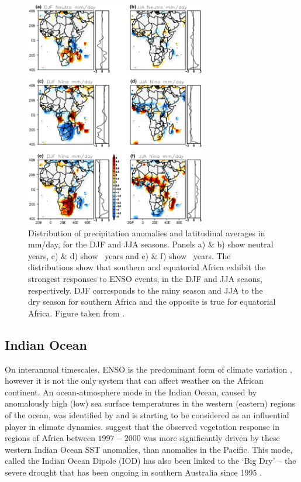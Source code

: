 \begin{figure}
  \centering
  \includegraphics[width=0.7\textwidth]{figures/enso_africa_rainfall_anoms}
  \caption{Distribution of precipitation anomalies and latitudinal averages in
    mm/day, for the DJF and JJA seasons. Panels a) \& b) show neutral years, c)
    \& d) show \elnino\ years and e) \& f) show \nina\ years. The distributions
    show that southern and equatorial Africa exhibit the strongest responses to
    ENSO events, in the DJF and JJA seaons, respectively. DJF corresponds to the
    rainy season and JJA to the dry season for southern Africa and the opposite
    is true for equatorial Africa. Figure taken from \cite{deoliveira2018}.}
  \label{fig:enso_rainfall_anoms}
\end{figure}

\subsection{Indian Ocean}
On interannual timescales, ENSO is the predominant form of climate variation
\citep{obrien1998}, however it is not the only system that can affect weather on
the African continent. An ocean-atmosphere mode in the Indian Ocean, caused by
anomalously high (low) sea surface temperatures in the western (eastern) regions
of the ocean, was identified by \cite{saji1999} and is starting to be considered
as an influential player in climate dynamics. \cite{anyamba2002} suggest that
the observed vegetation response in regions of Africa between $1997-2000$ was
more significantly driven by these western Indian Ocean SST anomalies, than
anomalies in the Pacific. This mode, called the Indian Ocean Dipole (IOD) has
also been linked to the `Big Dry' -- the severe drought that has been ongoing in
southern Australia since 1995 \citep{karumuri2003, ummenhofer2009}.

